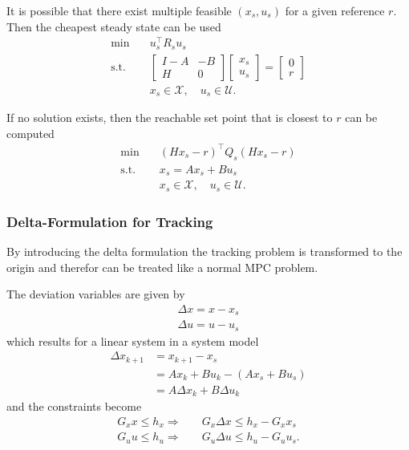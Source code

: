 \newpar{}

It is possible that there exist multiple feasible $(x_s, u_s)$ for a given reference $r$. Then the cheapest steady state can be used
\begin{align*}
    \min\quad    & u_s^\top R_s u_s                                \\
    \text{s.t. } & \begin{bmatrix}
                       I-A & -B \\
                       H   & 0
                   \end{bmatrix}
    \begin{bmatrix}
        x_s \\
        u_s
    \end{bmatrix}
    = \begin{bmatrix}
          0 \\
          r
      \end{bmatrix}                                               \\
                 & x_s \in \mathcal{X}, \quad u_s \in \mathcal{U}.
\end{align*}

If no solution exists, then the reachable set point that is closest to $r$ can be computed
\begin{align*}
    \min\quad    & {\left(Hx_s -r\right)}^\top Q_s \left(Hx_s -r\right) \\
    \text{s.t. } & x_s = Ax_s + Bu_s                                    \\
                 & x_s \in \mathcal{X}, \quad u_s \in \mathcal{U}.
\end{align*}

\subsubsection{Delta-Formulation for Tracking}

By introducing the delta formulation the tracking problem is transformed to the origin and therefor can be treated like a normal MPC problem.

\newpar{}

The deviation variables are given by
\begin{gather*}
    \Delta x = x - x_s \\
    \Delta u = u - u_s
\end{gather*}
which results for a linear system in a system model
\begin{align*}
    \Delta x_{k+1} & = x_{k+1}-x_s                \\
                   & = Ax_k + Bu_k -(Ax_s + Bu_s) \\
                   & = A\Delta x_k + B\Delta u_k
\end{align*}
and the constraints become
\begin{align*}
    G_x x \leq h_x \Rightarrow & \quad G_x\Delta x \leq h_x - G_x x_s  \\
    G_u u \leq h_u \Rightarrow & \quad G_u\Delta u \leq h_u - G_u u_s.
\end{align*}

